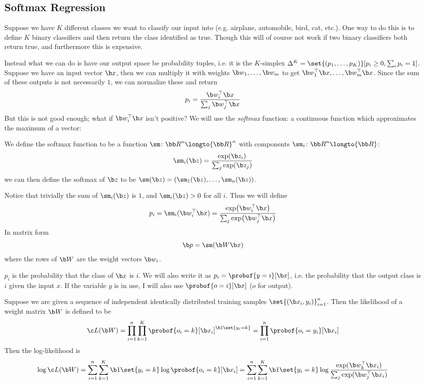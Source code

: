 \subsection{Softmax Regression}

Suppose we have $K$ different classes we want to classify our input into (e.g. airplane, automobile, bird, cat, etc.).
One way to do this is to define $K$ binary classifiers and then return the class identified as true.
Though this will of course not work if two binary classifiers both return true, and furthermore this is expensive.

Instead what we can do is have our output space be probability tuples, i.e. it is the $K$-simplex $\Delta^K=\set{(p_1,\dots,p_K)}[p_i\geq0,\sum_ip_i=1]$.
Suppose we have an input vector $\b x$, then we can multiply it with weights $\b w_1,\dots,\b w_m$ to get $\b w_1^\top\b x,\dots,\b w_m^\top\b x$.
Since the sum of these outputs is not necessarily $1$, we can normalize these and return
$$ p_i = \frac{\b w_i^\top\b x}{\sum_j\b w_j^\top\b x} $$
But this is not good enough; what if $\b w_i^\top\b x$ isn't positive?
We will use the {\it softmax} function: a continuous function which approximates the maximum of a vector:

\bdefn

    We define the {\emphcolor softmax} function to be a function $\sm\colon{\bb R}^n\longto{\bb R}^n$ with components $\sm_i\colon{\bb R}^n\longto{\bb R}$:
    $$ \sm_i(\b z) = \frac{\exp(\b z_i)}{\sum_j\exp(\b z_j)} $$
    we can then define the softmax of $\b z$ to be $\sm(\b z)=(\sm_1(\b z),\dots,\sm_n(\b z))$.

\edefn

\noindent Notice that trivially the sum of $\sm_i(\b z)$ is $1$, and $\sm_i(\b z)>0$ for all $i$.
Thus we will define
$$ p_i = \sm_i(\b w_i^\top\b x) = \frac{\exp\bigl(\b w_i^\top\b x\bigr)}{\sum_j\exp\bigl(\b w_j^\top\b x\bigr)} $$
In matrix form
$$ \b p = \sm(\b W\b x) $$
where the rows of $\b W$ are the weight vectors $\b w_i$.

$p_i$ is the probability that the class of $\b x$ is $i$.
We will also write it as $p_i=\probof{y=i}[\b x]$, i.e. the probability that the output class is $i$ given the input $x$.
If the variable $y$ is in use, I will also use $\probof{o=i}[\b x]$ ($o$ for output).

\bdefn

    Suppose we are given a sequence of independent identically distributed training samples $\set{(\b x_i,y_i)}_{i=1}^n$.
    Then the {\emphcolor likelihood} of a weight matrix $\b W$ is defined to be
    $$ \c L(\b W) = \prod_{i=1}^n\prod_{k=1}^K\probof{o_i=k}[\b x_i]^{\b 1\set{y_i=k}} = \prod_{i=1}^n\probof{o_i=y_i}[\b x_i] $$
    Then the {\emphcolor log-likelihood} is
    $$ \log\c L(\b W) = \sum_{i=1}^n\sum_{k=1}^K\b 1\set{y_i=k}\log\probof{o_i=k}[\b x_i] = \sum_{i=1}^n\sum_{k=1}^K\b 1\set{y_i=k}\log\frac{\exp(\b w_k^\top\b x_i)}{\sum_j\exp(\b w_j^\top\b x_i)} $$

